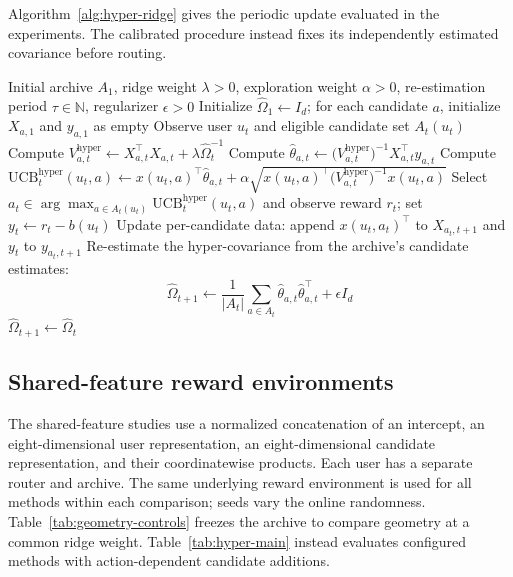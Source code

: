 \documentclass{article} %
\begin{document}
Algorithm~\ref{alg:hyper-ridge} gives the periodic update evaluated in the
experiments. The calibrated procedure instead fixes its independently
estimated covariance before routing.

\begin{algorithm}[t]
\caption{HyperRidge-Periodic (HRP): routing with periodic covariance updates}
\label{alg:hyper-ridge}
\begin{algorithmic}[1]
\Require Initial archive $A_1$, ridge weight $\lambda > 0$, exploration
  weight $\alpha > 0$, re-estimation period $\tau \in \mathbb{N}$,
  regularizer $\epsilon > 0$
\State Initialize $\widehat{\Omega}_1 \gets I_d$; for each candidate $a$,
  initialize $X_{a,1}$ and $y_{a,1}$ as empty
  \State Observe user $u_t$ and eligible candidate set $A_t(u_t)$
    \State Compute
      $V_{a,t}^{\mathrm{hyper}} \gets X_{a,t}^\top X_{a,t}
        + \lambda \widehat{\Omega}_t^{-1}$
    \State Compute
      $\widehat{\theta}_{a,t} \gets
        \bigl( V_{a,t}^{\mathrm{hyper}} \bigr)^{-1}
        X_{a,t}^\top y_{a,t}$
    \State Compute
      $\mathrm{UCB}_t^{\mathrm{hyper}}(u_t, a) \gets
        x(u_t, a)^\top \widehat{\theta}_{a,t}
        + \alpha \sqrt{ x(u_t, a)^\top
          \bigl( V_{a,t}^{\mathrm{hyper}} \bigr)^{-1} x(u_t, a) }$
  \EndFor
  \State Select
    $a_t \in \arg\max_{a \in A_t(u_t)} \mathrm{UCB}_t^{\mathrm{hyper}}(u_t, a)$
    and observe reward $r_t$; set $y_t\gets r_t-b(u_t)$
  \State Update per-candidate data: append $x(u_t, a_t)^\top$ to
    $X_{a_t, t+1}$ and $y_t$ to $y_{a_t, t+1}$
    \State Re-estimate the hyper-covariance from the archive's
      candidate estimates:
      \begin{equation}
        \widehat{\Omega}_{t+1} \gets
          \frac{1}{|A_t|} \sum_{a \in A_t}
          \widehat{\theta}_{a,t} \widehat{\theta}_{a,t}^\top
          + \epsilon I_d
      \end{equation}
  \Else
    \State $\widehat{\Omega}_{t+1} \gets \widehat{\Omega}_t$
  \EndIf
\EndFor
\end{algorithmic}
\end{algorithm}

\subsection{Shared-feature reward environments}

The shared-feature studies use a normalized concatenation of an intercept,
an eight-dimensional user representation, an eight-dimensional candidate
representation, and their coordinatewise products. Each user has a separate
router and archive. The same underlying reward environment is used for all
methods within each comparison; seeds vary the online randomness.
Table~\ref{tab:geometry-controls} freezes the archive to compare geometry
at a common ridge weight. Table~\ref{tab:hyper-main} instead evaluates
configured methods with action-dependent candidate additions.
\end{document}
